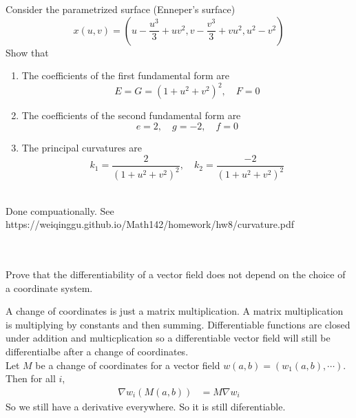 \documentclass[12pt,letterpaper]{hmcpset}
\begin{document}
\begin{problem}
\\ \\
Consider the parametrized surface (Enneper’s surface)  
$$x(u,v) = \left(u-\frac{u^3}{3}+ uv^2,v-\frac{v^3}{3}+ vu^2, u^2-v^2 \right)$$
Show that 
\begin{enumerate}
    \item The coefficients of the first fundamental form are
    $$E=G=(1+u^2+v^2)^2, \quad F=0$$
    \item The coefficients of the second fundamental form are 
    $$e = 2,\quad g=-2,\quad f=0$$
    \item The principal curvatures are  
    $$k_1 = \frac{2}{(1+u^2+v^2)^2}, \quad k_2 = \frac{-2}{(1+u^2+v^2)^2}$$\\
\end{enumerate}
\end{problem}
\begin{solution}
Done compuationally. See
https://weiqinggu.github.io/Math142/homework/hw8/curvature.pdf
\end{solution}

\begin{problem}
\\ \\
Prove that the differentiability of a vector field does not depend on the choice of a coordinate system.\\
\end{problem}
\begin{solution}
  A change of coordinates is just a matrix multiplication. A matrix
  multiplication is multiplying by constants and then summing. Differentiable
  functions are closed under addition and multicplication so a differentiable
  vector field will still be differentialbe after a change of coordinates. \\
  Let $M$ be a change of coordinates for a vector field $w(a, b) = (w_1(a, b),
\cdots)$. Then for all $i$,
  \begin{align*}
    \nabla w_i(M(a, b)) &= M \nabla w_i 
  \end{align*}
  So we still have a derivative everywhere. So it is still diferentiable. 
\end{solution}
\end{document}
